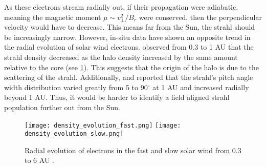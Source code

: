As these electrons stream radially out, if their propagation were adiabatic,
meaning the magnetic moment $\mu\sim v_\perp^2/B_r$ were conserved, then the
perpendicular velocity would have to decrease. This means far from the Sun, the
strahl should be increasingly narrow. However, in-situ data have shown an
opposite trend in the radial evolution of solar wind electrons.
\cite{Stverak2009} observed from 0.3 to 1 AU that the strahl density decreased
as the halo density increased by the same amount relative to the core (see
\cref{fig:density_radial_evolution}). This suggests that the origin of the halo
is due to the scattering of the strahl. Additionally, \cite{Anderson2012} and
\cite{Graham2017} reported that the strahl's pitch angle width distribution
varied greatly from 5 to 90$^\circ$ at 1 AU and increased radially beyond 1 AU.
Thus, it would be harder to identify a field aligned strahl population further
out from the Sun.

\begin{figure}
    \centering
    \texttt{[image: density\_evolution\_fast.png]}
    \texttt{[image: density\_evolution\_slow.png]}
    \caption{Radial evolution of electrons in the fast and slow
    solar wind from 0.3 to 6 AU \citep{Stverak2009}.}
\label{fig:density_radial_evolution}
\end{figure}

